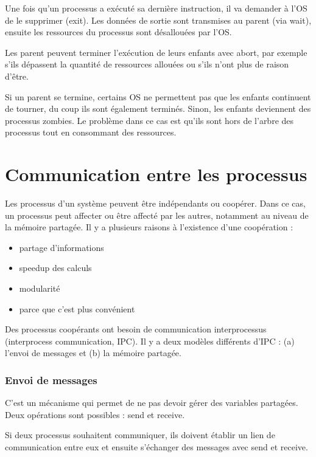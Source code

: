 Une fois qu'un processus a exécuté sa dernière instruction, il va demander à l'OS de le supprimer (exit). Les données de sortie sont transmises au parent (via wait), ensuite les ressources du processus sont désallouées par l'OS.

Les parent peuvent terminer l'exécution de leurs enfants avec abort, par exemple s'ils dépassent la quantité de ressources allouées ou s'ils n'ont plus de raison d'être.

Si un parent se termine, certains OS ne permettent pas que les enfants continuent de tourner, du coup ils sont également terminés. Sinon, les enfants deviennent des processus zombies. Le problème dans ce cas est qu'ils sont hors de l'arbre des processus tout en consommant des ressources.

\section{Communication entre les processus}

Les processus d'un système peuvent être indépendants ou coopérer. Dans ce cas, un processus peut affecter ou être affecté par les autres, notamment au niveau de la mémoire partagée. Il y a plusieurs raisons à l'existence d'une coopération :

\begin{itemize}
	\item partage d'informations
	\item speedup des calculs
	\item modularité
	\item parce que c'est plus convénient
\end{itemize}

Des processus coopérants ont besoin de communication interprocessus (interprocess communication, IPC). Il y a deux modèles différents d'IPC : (a) l'envoi de messages et (b) la mémoire partagée.


	\subsubsection{Envoi de messages}
	
	C'est un mécanisme qui permet de ne pas devoir gérer des variables partagées. Deux opérations sont possibles : send et receive.
	
	Si deux processus souhaitent communiquer, ils doivent établir un lien de communication entre eux et ensuite s'échanger des messages avec send et receive.
	
